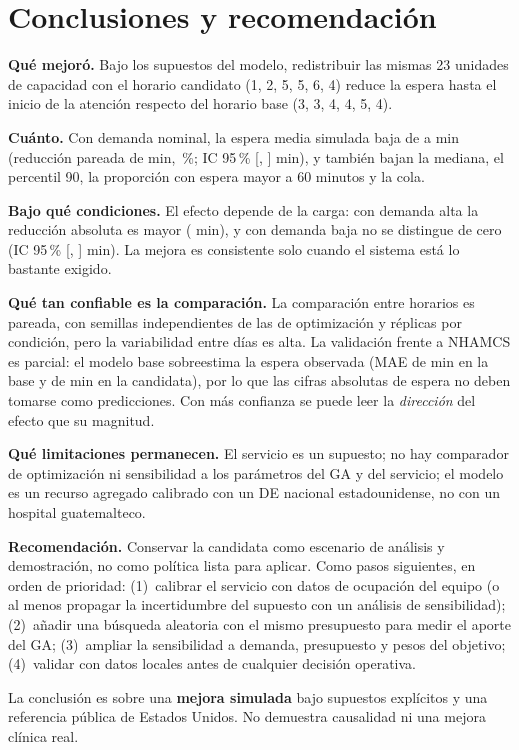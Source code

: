 \section{Conclusiones y recomendación}

\textbf{Qué mejoró.} Bajo los supuestos del modelo, redistribuir las mismas 23 unidades de
capacidad con el horario candidato (1, 2, 5, 5, 6, 4) reduce la espera hasta el inicio de la
atención respecto del horario base (3, 3, 4, 4, 5, 4).

\textbf{Cuánto.} Con demanda nominal, la espera media simulada baja de \WaitBaseNom{} a
\WaitCandNom{} min (reducción pareada de \RedNom{} min, \RedPctNom\,\%; IC 95\,\%
[\RedCILowNom, \RedCIHighNom] min), y también bajan la mediana, el percentil 90, la
proporción con espera mayor a 60 minutos y la cola.

\textbf{Bajo qué condiciones.} El efecto depende de la carga: con demanda alta la
reducción absoluta es mayor (\RedHigh{} min), y con demanda baja no se distingue de cero
(IC 95\,\% [\RedCILowLow, \RedCIHighLow] min). La mejora es consistente solo cuando el
sistema está lo bastante exigido.

\textbf{Qué tan confiable es la comparación.} La comparación entre horarios es pareada, con
semillas independientes de las de optimización y \NReps{} réplicas por condición, pero la
variabilidad entre días es alta. La validación frente a NHAMCS es parcial: el modelo base
sobreestima la espera observada (MAE de \MaeBase{} min en la base y de \MaeCand{} min en la
candidata), por lo que las cifras absolutas de espera no deben tomarse como predicciones.
Con más confianza se puede leer la \emph{dirección} del efecto que su magnitud.

\textbf{Qué limitaciones permanecen.} El servicio es un supuesto; no hay comparador de
optimización ni sensibilidad a los parámetros del GA y del servicio; el modelo es un recurso
agregado calibrado con un DE nacional estadounidense, no con un hospital guatemalteco.

\textbf{Recomendación.} Conservar la candidata como escenario de análisis y demostración,
no como política lista para aplicar. Como pasos siguientes, en orden de prioridad:
(1)~calibrar el servicio con datos de ocupación del equipo (o al menos propagar la
incertidumbre del supuesto con un análisis de sensibilidad); (2)~añadir una búsqueda
aleatoria con el mismo presupuesto para medir el aporte del GA; (3)~ampliar la
sensibilidad a demanda, presupuesto y pesos del objetivo; (4)~validar con datos locales
antes de cualquier decisión operativa.

\begin{alcance}
La conclusión es sobre una \textbf{mejora simulada} bajo supuestos explícitos y una
referencia pública de Estados Unidos. No demuestra causalidad ni una mejora clínica real.
\end{alcance}
